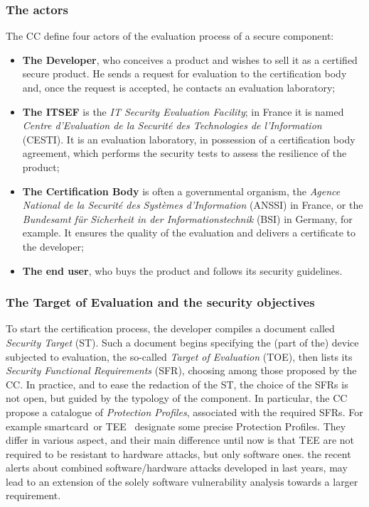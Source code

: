 \subsubsection{The actors} The CC define four actors of the evaluation process of a secure component:
\begin{itemize}
\item \textbf{The Developer}, who conceives a product and wishes to sell it as a certified secure product. He sends a request for evaluation to the certification body and, once the request is accepted, he contacts an evaluation laboratory;
\item \textbf{The ITSEF} is the \emph{IT Security Evaluation Facility}; in France it is named \emph{Centre d'Evaluation de la Securit\'e des Technologies de l'Information} (CESTI). It is an evaluation laboratory, in possession of a certification body agreement, which performs the security tests to assess the resilience of the product;
\item \textbf{The Certification Body} is often a governmental organism, the \emph{Agence National de la Securit\'e des Syst\`emes d'Information} (ANSSI) in France, or the \emph{Bundesamt f\"ur Sicherheit in der Informationstechnik} (BSI) in Germany, for example. It ensures the quality of the evaluation and delivers a certificate to the developer;
\item \textbf{The end user}, who buys the product and follows its security guidelines.
\end{itemize} 

\subsubsection{The Target of Evaluation and the security objectives} 
To start the certification process, the developer compiles a document called \emph{Security Target} (ST). Such a document begins specifying the (part of the) device subjected to evaluation, the so-called \emph{Target of Evaluation} (TOE), then lists its \emph{Security Functional Requirements} (SFR), choosing among those proposed by the CC. In practice, and to ease the redaction of the ST, the choice of the SFRs is not open, but guided by the typology of the component. In particular, the CC propose a catalogue of \emph{Protection Profiles}, associated with the required SFRs. For example \textquotedbl smartcard\textquotedbl \ or \textquotedbl TEE \textquotedbl \  designate some precise Protection Profiles. They differ in various aspect, and their main difference until now is that TEE are not required to be resistant to hardware attacks, but only software ones. the recent alerts about combined software/hardware attacks developed in last years, may lead to an extension of the solely software vulnerability analysis towards a larger requirement.

